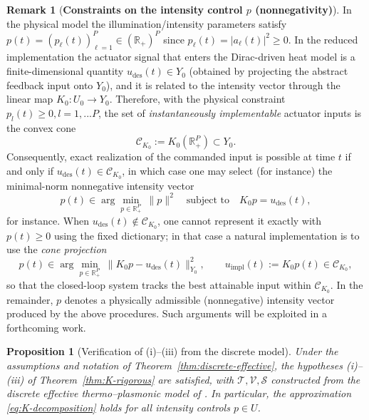 \documentclass[11pt,a4paper]{article}
\numberwithin{equation}{section}
\newtheorem{proposition}[theorem]{Proposition}
\theoremstyle{definition}
\newtheorem{remark}[theorem]{Remark}
\newcommand{\1}{\mathbbm{1}}
\begin{document}
\begin{remark}[\textbf{Constraints on the intensity control $p$ (nonnegativity)}] \label{Positivity-p}
In the physical model the illumination/intensity parameters satisfy
$p(t)=(p_\ell(t))_{\ell=1}^P\in(\mathbb{R}_+)^P$ since $p_\ell(t)=|a_\ell(t)|^2\ge 0$.
In the reduced implementation the actuator signal that enters the
Dirac-driven heat model is a finite-dimensional quantity
$u_{\mathrm{des}}(t)\in Y_0$ (obtained by projecting the abstract feedback input onto $Y_0$), and it is related to
the intensity vector through the linear map $K_0:U_0\to Y_0$.
Therefore, with the physical constraint $p_l(t)\ge 0, l=1, ... P$, the set of \emph{instantaneously implementable} actuator inputs
is the convex cone
\[
\mathcal{C}_{K_0}:=K_0(\mathbb{R}_+^P)\subset Y_0 .
\]
Consequently, exact realization of the commanded input is possible at time $t$ if and only if
$u_{\mathrm{des}}(t)\in \mathcal{C}_{K_0}$, in which case one may select (for instance) the minimal-norm nonnegative
intensity vector
\[
p(t)\in \arg\min_{p\in\mathbb{R}_+^P}\ \|p\|^2
\quad\text{subject to}\quad K_0 p = u_{\mathrm{des}}(t),
\]
for instance.
When $u_{\mathrm{des}}(t)\notin \mathcal{C}_{K_0}$, one cannot represent it exactly with $p(t)\ge 0$ using the fixed
dictionary; in that case a natural implementation is to use the \emph{cone projection}
\[
p(t)\in \arg\min_{p\in\mathbb{R}_+^P}\ \|K_0 p-u_{\mathrm{des}}(t)\|_{Y_0}^2,
\qquad u_{\mathrm{impl}}(t):=K_0 p(t)\in\mathcal{C}_{K_0},
\]
so that the closed-loop system tracks the best attainable input within $\mathcal{C}_{K_0}$.
In the remainder, $p$ denotes a physically admissible (nonnegative) intensity vector produced by the above procedures. Such arguments will be exploited in a forthcoming work.
\end{remark}







\begin{proposition}[Verification of (i)--(iii) from the discrete model]
\label{prop:verification-K}
Under the assumptions and notation of Theorem~\ref{thm:discrete-effective},
the hypotheses (i)--(iii) of Theorem~\ref{thm:K-rigorous} are satisfied,
with $\mathcal{T},\mathcal{V},\mathcal{S}$ constructed from the discrete
effective thermo--plasmonic model of \cite{CaoMukherjeeSini2025}. In
particular, the approximation \eqref{eq:K-decomposition} holds for all
intensity controls $p\in U$.
\end{proposition}
\end{document}
